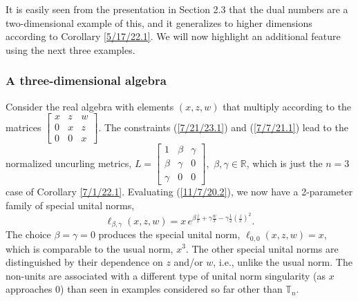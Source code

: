 \documentclass{amsart}
\numberwithin{equation}{section}
\theoremstyle{definition}
\numberwithin{theorem}{section}
\begin{document}
It is easily seen from the presentation in Section 2.3 that the dual numbers are a two-dimensional example of this, and it
generalizes to higher dimensions according to Corollary \ref{5/17/22.1}.  We will now highlight an additional feature using the next three examples.  

\subsubsection{A three-dimensional algebra}Consider the real algebra with elements  $(x,z,w)$ that multiply according to the matrices $ \left[
\begin{array}{ccc}
x & z & w   \\
0 & x & z \\
0 & 0 & x  
\end{array}
\right]$.    The constraints (\ref{7/21/23.1}) and (\ref{7/7/21.1}) lead to the normalized uncurling metrics, $ L = \left[
\begin{array}{ccc}
1 & \beta & \gamma   \\
\beta & \gamma & 0 \\
\gamma & 0 & 0  
\end{array}
\right], \,\,\beta,\gamma\in\mathbb{R}$, which is just the $n=3$ case of Corollary \ref{7/1/22.1}.    Evaluating (\ref{11/7/20.2}), we now have a 2-parameter family of special unital norms, \begin{equation}\label{3/31/21.3} \ell_{\beta,\gamma}(x,z,w) = x\, e^{ \beta\frac{z}{x}  +\gamma \frac{w}{x} -\gamma \frac{ 1}{2}\left(\frac{z}{x}\right)^2 }.\end{equation}    The choice $\beta = \gamma = 0$ produces the special unital norm, $\ell_{0,0}(x,z,w)= x$, which is comparable to the usual norm, $x^3$. 
 The other special unital norms are distinguished by their dependence on $z$ and/or $w$, i.e., unlike the usual norm.  The non-units are associated with a different type of unital norm singularity (as $x$ approaches 0) than seen in examples considered so far other than $\mathbb{T}_n$.
 
\end{document}
